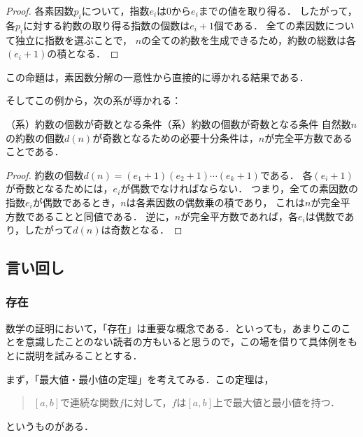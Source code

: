 \documentclass[a4paper,11pt]{ltjsarticle}
\newenvironment{tleftbar}{\begin{tbleftline}\setlength{\parindent}{1\zw}}{\end{tbleftline}}
\begin{document}
\begin{tleftbar}
\begin{proof}
各素因数$p_i$について，指数$e_i$は$0$から$e_i$までの値を取り得る．
したがって，各$p_i$に対する約数の取り得る指数の個数は$e_i + 1$個である．
全ての素因数について独立に指数を選ぶことで，
$n$の全ての約数を生成できるため，約数の総数は各$(e_i + 1)$の積となる．
\end{proof}
\end{tleftbar}

この命題は，素因数分解の一意性から直接的に導かれる結果である．

そしてこの例から，次の系が導かれる：

\begin{example}{（系）約数の個数が奇数となる条件}{（系）約数の個数が奇数となる条件}
自然数$n$の約数の個数$d(n)$が奇数となるための必要十分条件は，$n$が完全平方数であることである．
\end{example}

\begin{tleftbar}
\begin{proof}
約数の個数$d(n) = (e_1 + 1)(e_2 + 1) \dotsm (e_k + 1)$である．
各$(e_i + 1)$が奇数となるためには，$e_i$が偶数でなければならない．
つまり，全ての素因数の指数$e_i$が偶数であるとき，$n$は各素因数の偶数乗の積であり，
これは$n$が完全平方数であることと同値である．
逆に，$n$が完全平方数であれば，各$e_i$は偶数であり，したがって$d(n)$は奇数となる．
\end{proof}
\end{tleftbar}

\subsection{言い回し}
\subsubsection{存在}



数学の証明において，「存在」は重要な概念である．といっても，あまりこのことを意識したことのない読者の方もいると思うので，この場を借りて具体例をもとに説明を試みることとする．

まず，「最大値・最小値の定理」を考えてみる．この定理は，
\begin{quotation}
	$[a,b]$で連続な関数$f$に対して，$f$は$[a,b]$上で最大値と最小値を持つ．
\end{quotation}
というものがある．
\end{document}
